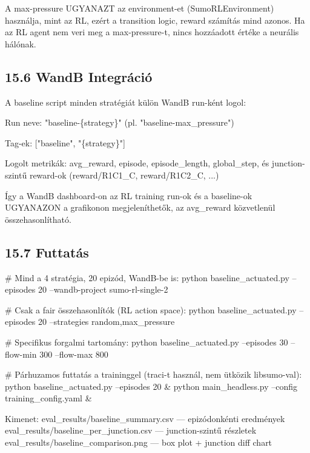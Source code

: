 \documentclass[11pt,a4paper]{article}
\begin{document}
A max-pressure UGYANAZT az environment-et (SumoRLEnvironment) használja,
mint az RL, ezért a transition logic, reward számítás mind azonos.
Ha az RL agent nem veri meg a max-pressure-t, nincs hozzáadott értéke
a neurális hálónak.

\subsection*{15.6 WandB Integráció}
A baseline script minden stratégiát külön WandB run-ként logol:
\par\noindent\hspace*{1em}\textbullet{} Run neve: "baseline-\{strategy\}" (pl. "baseline-max\_pressure")
\par\noindent\hspace*{1em}\textbullet{} Tag-ek: ["baseline", "\{strategy\}"]
\par\noindent\hspace*{1em}\textbullet{} Logolt metrikák: avg\_reward, episode, episode\_length, global\_step,
és junction-szintű reward-ok (reward/R1C1\_C, reward/R1C2\_C, ...)

Így a WandB dashboard-on az RL training run-ok és a baseline-ok
UGYANAZON a grafikonon megjeleníthetők, az avg\_reward közvetlenül
összehasonlítható.

\subsection*{15.7 Futtatás}
\# Mind a 4 stratégia, 20 epizód, WandB-be is:
python baseline\_actuated.py --episodes 20 --wandb-project sumo-rl-single-2

\# Csak a fair összehasonlítók (RL action space):
python baseline\_actuated.py --episodes 20 --strategies random,max\_pressure

\# Specifikus forgalmi tartomány:
python baseline\_actuated.py --episodes 30 --flow-min 300 --flow-max 800

\# Párhuzamos futtatás a traininggel (traci-t használ, nem ütközik libsumo-val):
python baseline\_actuated.py --episodes 20 \&
python main\_headless.py --config training\_config.yaml \&

Kimenet:
eval\_results/baseline\_summary.csv       — epizódonkénti eredmények
eval\_results/baseline\_per\_junction.csv   — junction-szintű részletek
eval\_results/baseline\_comparison.png     — box plot + junction diff chart
\end{document}
